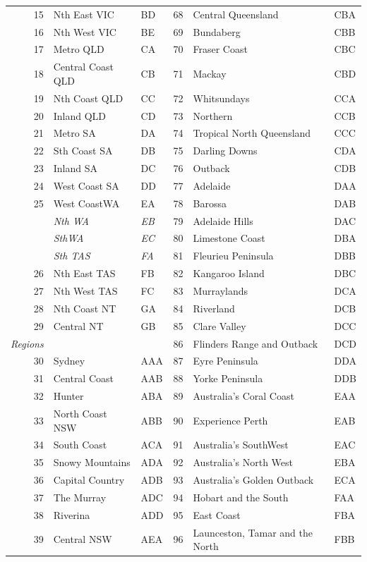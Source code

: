 \documentclass[a4paper,11pt]{article}
\theoremstyle{definition}
\begin{document}
\begin{table}[H]
\begin{tabular}{r l l|r l l}
		15 &Nth East VIC& BD &68 &Central Queensland &CBA\\
		16 &Nth West VIC &BE& 69 &Bundaberg& CBB\\
		17 &Metro QLD &CA &70 &Fraser Coast &CBC\\
		18 &Central Coast QLD &CB &71& Mackay& CBD\\
		19 &Nth Coast QLD& CC &72 &Whitsundays &CCA\\
		20 &Inland QLD &CD &73 &Northern &CCB\\
		21 &Metro SA &DA& 74& Tropical North Queensland &CCC\\
		22 &Sth Coast SA &DB& 75 &Darling Downs &CDA\\
		23 &Inland SA &DC &76& Outback& CDB\\
		24 &West Coast SA& DD &77& Adelaide &DAA\\
		25 &West CoastWA &EA& 78& Barossa& DAB\\
		&\textit{Nth WA}& \textit{EB} &79& Adelaide Hills &DAC\\
		&\textit{SthWA} & \textit{EC}& 80 &Limestone Coast& DBA\\
		&\textit{Sth TAS} &\textit{FA}& 81 &Fleurieu Peninsula &DBB\\
		26 &Nth East TAS &FB &82& Kangaroo Island &DBC\\
		27 &Nth West TAS &FC& 83 &Murraylands &DCA\\
		28 &Nth Coast NT &GA& 84& Riverland &DCB\\
		29 &Central NT &GB& 85& Clare Valley& DCC\\
		\cline{1-3}
		\multicolumn{1}{l}{\textit{Regions}}&&&86& Flinders Range and Outback &DCD \\
		30 &Sydney &AAA& 87& Eyre Peninsula& DDA\\
		31 &Central Coast &AAB &88 &Yorke Peninsula &DDB\\
		32 &Hunter &ABA& 89 &Australia’s Coral Coast& EAA\\
		33 &North Coast NSW &ABB& 90& Experience Perth& EAB\\
		34 &South Coast &ACA& 91 &Australia’s SouthWest &EAC\\
		35 &Snowy Mountains &ADA& 92& Australia’s North West& EBA\\
		36 &Capital Country &ADB& 93 &Australia’s Golden Outback &ECA\\
		37 &The Murray &ADC& 94 &Hobart and the South &FAA\\
		38 &Riverina &ADD & 95& East Coast &FBA\\
		39 &Central NSW &AEA&96 &Launceston, Tamar and the North &FBB\\

\end{tabular}
\end{table}
\end{document}
